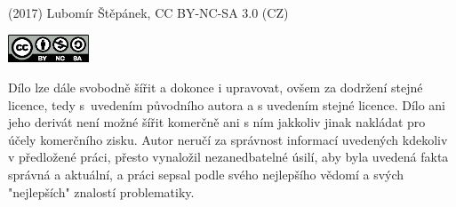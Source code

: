 
\thispagestyle{empty}
{\small
  \strut\vfill
  
  \noindent (2017) Lubomír Štěpánek, CC BY-NC-SA 3.0 (CZ)
  
  \vspace{0.2cm}
  
  \noindent \includegraphics[width=0.18\textwidth]{figures/by_nc_sa.eps}
  
  \vspace{0.2cm}
  
  \noindent Dílo lze dále svobodně šířit a dokonce i upravovat, ovšem za
  dodržení stejné licence, tedy s~uvedením původního autora a s uvedením
  stejné licence. Dílo ani jeho derivát není možné šířit komerčně ani s ním
  jakkoliv jinak nakládat pro účely komerčního zisku. Autor neručí za
  správnost informací uvedených kdekoliv v předložené práci, přesto vynaložil
  nezanedbatelné úsilí, aby byla uvedená fakta správná a aktuální, a práci
  sepsal podle svého nejlepšího vědomí a svých "nejlepších" znalostí
  problematiky.
  
}







